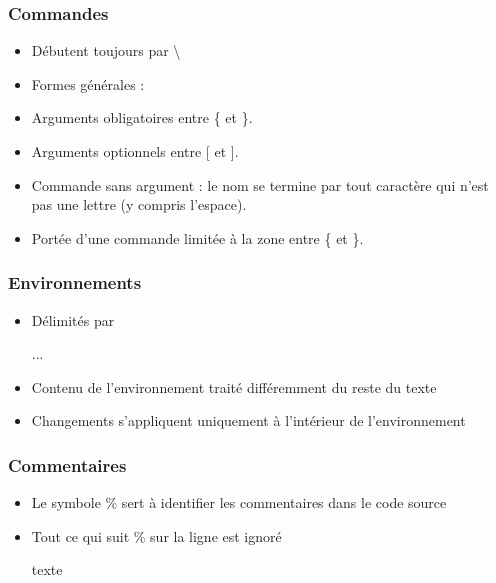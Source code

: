 \begin{frame}[fragile]

	\frametitle{Commandes}
	
	\begin{itemize}
		\item Débutent toujours par \textbackslash
		\item Formes générales : 
			
	\begin{codesource}
	\end{codesource}
					
		\item Arguments obligatoires entre \{  et \}.
		\item Arguments optionnels entre [ et ].
		\item Commande sans argument : le nom se termine par tout caractère	qui n’est pas une lettre (y compris l’espace).
		\item Portée d’une commande limitée à la zone entre \{  et \}.
	\end{itemize}

\end{frame}


\begin{frame}[fragile]

	\frametitle{Environnements}
	
	\begin{itemize}
		\item Délimités par
		
	\begin{codesource}
	\begin{environnement}
		...
	\end{environnement}
	\end{codesource}
	
		\item Contenu de l’environnement traité différemment du reste du texte
		\item Changements s’appliquent uniquement à l’intérieur de l’environnement
	\end{itemize}

\end{frame}


\begin{frame}[fragile]
	
	\frametitle{Commentaires}
	
	\begin{itemize}
		\item Le symbole \% sert à identifier les commentaires dans le code	source
		\item Tout ce qui suit \% sur la ligne est ignoré
		
		\begin{codesource}
	texte %
		\end{codesource}
	\end{itemize}
\end{frame}

